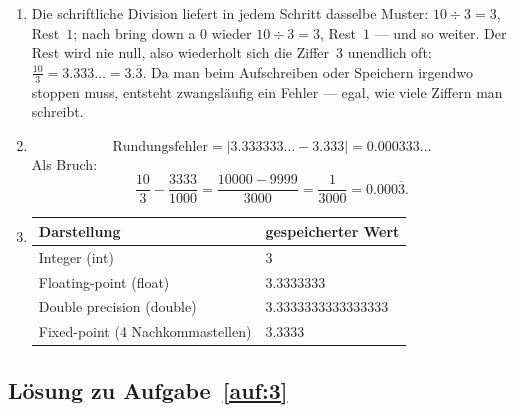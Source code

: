 \documentclass[a4paper,11pt]{scrartcl}
\begin{document}
\begin{enumerate}[label=(\alph*)]
  \item Die schriftliche Division liefert in jedem Schritt dasselbe Muster: $10 \div 3 = 3$, Rest~$1$; nach \glqq bring down a 0\grqq{} wieder $10 \div 3 = 3$, Rest~$1$ --- und so weiter. Der Rest wird nie null, also wiederholt sich die Ziffer~$3$ unendlich oft: $\frac{10}{3} = 3.333\ldots = 3.\overline{3}$. Da man beim Aufschreiben oder Speichern irgendwo stoppen muss, entsteht zwangsläufig ein Fehler --- egal, wie viele Ziffern man schreibt.
  \item
  \[
  \text{Rundungsfehler} = \left| 3.333333\ldots - 3.333 \right| = 0.000333\ldots
  \]
  Als Bruch:
  \[
  \frac{10}{3} - \frac{3333}{1000} = \frac{10000 - 9999}{3000} = \frac{1}{3000} = 0.000\overline{3}.
  \]
  \item
  \begin{center}
  \begin{tabular}{ll}
  \toprule
  Darstellung & gespeicherter Wert \\
  \midrule
  Integer (int) & $3$ \\
  Floating-point (float) & $3.3333333$ \\
  Double precision (double) & $3.3333333333333333$ \\
  Fixed-point (4 Nachkommastellen) & $3.3333$ \\
  \bottomrule
  \end{tabular}
  \end{center}
\end{enumerate}

\subsection*{Lösung zu Aufgabe~\ref{auf:3}}
\end{document}
